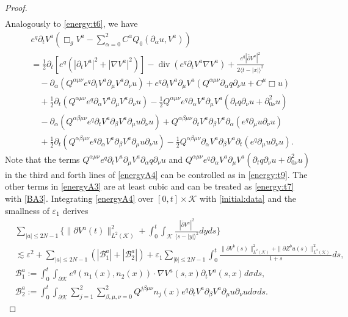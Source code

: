 \documentclass[11pt,twoside]{article}
\def\cB{\mathcal B}
\def\cK{\mathcal K}
\def\p{\partial}
\def\ve{\varepsilon}
\def\dive{\operatorname{div}}
\def\ls{\lesssim}
\newcommand{\w}[1]{\langle {#1} \rangle}
\theoremstyle{plain}
\theoremstyle{definition}
\numberwithin{equation}{section}
\begin{document}
\begin{proof}
\begin{equation}
\begin{split}
\end{split}
\end{equation}
Analogously to \eqref{energy:t6}, we have
\begin{equation}\label{energyA4}
\begin{split}
&e^q\p_tV^a(\Box_gV^a-\sum_{\alpha=0}^2C^{\alpha}Q_0(\p_{\alpha}u,V^a))\\
&=\frac12\p_t[e^q(|\p_tV^a|^2+|\nabla V^a|^2)]-\dive(e^q\p_tV^a\nabla V^a)+\frac{e^q|\bar\p V^a|^2}{2\w{t-|x|}^2}\\
&\quad-\p_{\alpha}(Q^{\alpha\mu\nu}e^q\p_tV^a\p_{\mu}V^a\p_{\nu}u)
+e^q\p_tV^a\p_{\mu}V^a(Q^{\alpha\mu\nu}\p_{\alpha}q\p_{\nu}u+C^{\mu}\Box u)\\
&\quad+\frac12\p_t(Q^{\alpha\mu\nu}e^q\p_{\alpha}V^a\p_{\mu}V^a\p_{\nu}u)
-\frac12Q^{\alpha\mu\nu}e^q\p_{\alpha}V^a\p_{\mu}V^a(\p_tq\p_{\nu}u+\p^2_{0\nu}u)\\
&\quad-\p_{\alpha}(Q^{\alpha\beta\mu\nu}e^q\p_tV^a\p_{\beta}V^a\p_{\mu}u\p_{\nu}u)+Q^{\alpha\beta\mu\nu}
\p_tV^a\p_{\beta}V^a\p_{\alpha}(e^q\p_{\mu}u\p_{\nu}u)\\
&\quad+\frac12\p_t(Q^{\alpha\beta\mu\nu}e^q\p_{\alpha}V^a\p_{\beta}V^a\p_{\mu}u\p_{\nu}u)
-\frac12Q^{\alpha\beta\mu\nu}\p_{\alpha}V^a\p_{\beta}V^a\p_t(e^q\p_{\mu}u\p_{\nu}u).
\end{split}
\end{equation}
Note that the terms $Q^{\alpha\mu\nu}e^q\p_tV^a\p_{\mu}V^a\p_{\alpha}q\p_{\nu}u$ and
$Q^{\alpha\mu\nu}e^q\p_{\alpha}V^a\p_{\mu}V^a(\p_tq\p_{\nu}u+\p^2_{0\nu}u)$ in the third and forth lines of \eqref{energyA4} can be controlled as in \eqref{energy:t9}.
The other terms in \eqref{energyA3} are at least cubic and can be treated as \eqref{energy:t7} with \eqref{BA3}.
Integrating \eqref{energyA4} over $[0,t]\times\cK$ with \eqref{initial:data} and the smallness of $\ve_1$ derives
\begin{equation}\label{energyA5}
\begin{split}
&\sum_{|a|\le2N-1}\Big\{\|\p V^a(t)\|^2_{L^2(\cK)}+\int_0^t\int_{\cK}\frac{|\bar\p V^a|^2}{\w{s-|y|}^2}dyds\Big\}\\
&\ls\ve^2+\sum_{|a|\le2N-1}(|\cB_1^a|+|\cB_2^a|)+\ve_1\sum_{|b|\le2N-1}\int_0^t\frac{\|\p V^b(s)\|^2_{L^2(\cK)}+\|\p Z^bu(s)\|^2_{L^2(\cK)}}{1+s}ds,\\
&\cB^a_1:=\int_0^t\int_{\p\cK}e^q(n_1(x),n_2(x))\cdot\nabla V^a(s,x)\p_tV^a(s,x)d\sigma ds,\\
&\cB^a_2:=\int_0^t\int_{\p\cK}\sum_{j=1}^2\sum_{\beta,\mu,\nu=0}^2
Q^{j\beta\mu\nu}n_j(x)e^q\p_tV^a\p_{\beta}V^a\p_{\mu}u\p_{\nu}ud\sigma ds.

\end{split}
\end{equation}
\end{proof}
\end{document}
